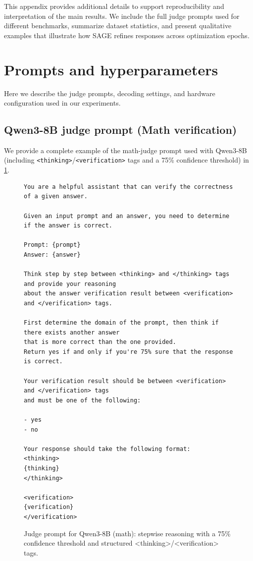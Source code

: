 \documentclass{article}
\theoremstyle{plain}
\theoremstyle{definition}
\theoremstyle{remark}
\begin{document}
% 



\newpage
\appendix
\onecolumn

This appendix provides additional details to support reproducibility and interpretation of the main results. We include the full judge prompts used for different benchmarks, summarize dataset statistics, and present qualitative examples that illustrate how SAGE refines responses across optimization epochs. 

\section{Prompts and hyperparameters}\label{sec:prompts-and-hyperparameters}
Here we describe the judge prompts, decoding settings, and hardware configuration used in our experiments.

\subsection{Qwen3-8B judge prompt (Math verification)}
We provide a complete example of the math-judge prompt used with Qwen3-8B (including \texttt{<thinking>}/\texttt{<verification>} tags and a 75\% confidence threshold) in \cref{fig:appendix-qwen-math-judge}.


\begin{figure}[h]
\centering
\begin{minipage}{0.95\textwidth}
\begin{small}
\begin{verbatim}
You are a helpful assistant that can verify the correctness of a given answer.

Given an input prompt and an answer, you need to determine if the answer is correct.

Prompt: {prompt}
Answer: {answer}

Think step by step between <thinking> and </thinking> tags and provide your reasoning
about the answer verification result between <verification> and </verification> tags.

First determine the domain of the prompt, then think if there exists another answer
that is more correct than the one provided.
Return yes if and only if you're 75% sure that the response is correct.

Your verification result should be between <verification> and </verification> tags
and must be one of the following:

- yes
- no

Your response should take the following format:
<thinking>
{thinking}
</thinking>

<verification>
{verification}
</verification>
\end{verbatim}
\end{small}
\end{minipage}
\caption{Judge prompt for Qwen3-8B (math): stepwise reasoning with a 75\% confidence threshold and structured <thinking>/<verification> tags.}
\label{fig:appendix-qwen-math-judge}
\end{figure}
\end{document}
